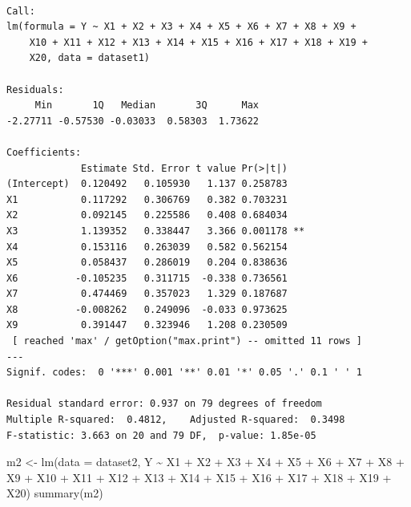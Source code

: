 \documentclass[
  letterpaper,
  DIV=11,
  numbers=noendperiod]{scrartcl}
\newenvironment{Shaded}{\begin{snugshade}}{\end{snugshade}}
\newcommand{\AttributeTok}[1]{\textcolor[rgb]{0.40,0.45,0.13}{#1}}
\newcommand{\FunctionTok}[1]{\textcolor[rgb]{0.28,0.35,0.67}{#1}}
\newcommand{\NormalTok}[1]{\textcolor[rgb]{0.00,0.23,0.31}{#1}}
\newcommand{\OtherTok}[1]{\textcolor[rgb]{0.00,0.23,0.31}{#1}}
\newcommand{\SpecialCharTok}[1]{\textcolor[rgb]{0.37,0.37,0.37}{#1}}
\begin{document}
\begin{verbatim}

Call:
lm(formula = Y ~ X1 + X2 + X3 + X4 + X5 + X6 + X7 + X8 + X9 + 
    X10 + X11 + X12 + X13 + X14 + X15 + X16 + X17 + X18 + X19 + 
    X20, data = dataset1)

Residuals:
     Min       1Q   Median       3Q      Max 
-2.27711 -0.57530 -0.03033  0.58303  1.73622 

Coefficients:
             Estimate Std. Error t value Pr(>|t|)    
(Intercept)  0.120492   0.105930   1.137 0.258783    
X1           0.117292   0.306769   0.382 0.703231    
X2           0.092145   0.225586   0.408 0.684034    
X3           1.139352   0.338447   3.366 0.001178 ** 
X4           0.153116   0.263039   0.582 0.562154    
X5           0.058437   0.286019   0.204 0.838636    
X6          -0.105235   0.311715  -0.338 0.736561    
X7           0.474469   0.357023   1.329 0.187687    
X8          -0.008262   0.249096  -0.033 0.973625    
X9           0.391447   0.323946   1.208 0.230509    
 [ reached 'max' / getOption("max.print") -- omitted 11 rows ]
---
Signif. codes:  0 '***' 0.001 '**' 0.01 '*' 0.05 '.' 0.1 ' ' 1

Residual standard error: 0.937 on 79 degrees of freedom
Multiple R-squared:  0.4812,    Adjusted R-squared:  0.3498 
F-statistic: 3.663 on 20 and 79 DF,  p-value: 1.85e-05
\end{verbatim}

\begin{Shaded}
\begin{Highlighting}[]
\NormalTok{m2 }\OtherTok{\textless{}{-}} \FunctionTok{lm}\NormalTok{(}\AttributeTok{data =}\NormalTok{ dataset2, Y }\SpecialCharTok{\textasciitilde{}}\NormalTok{ X1 }\SpecialCharTok{+}\NormalTok{ X2 }\SpecialCharTok{+}\NormalTok{ X3 }\SpecialCharTok{+}\NormalTok{ X4 }\SpecialCharTok{+}\NormalTok{ X5 }\SpecialCharTok{+}\NormalTok{ X6 }\SpecialCharTok{+}\NormalTok{ X7 }\SpecialCharTok{+}\NormalTok{ X8 }\SpecialCharTok{+}\NormalTok{ X9 }\SpecialCharTok{+}\NormalTok{ X10 }\SpecialCharTok{+} 
\NormalTok{           X11 }\SpecialCharTok{+}\NormalTok{ X12 }\SpecialCharTok{+}\NormalTok{ X13 }\SpecialCharTok{+}\NormalTok{ X14 }\SpecialCharTok{+}\NormalTok{ X15 }\SpecialCharTok{+}\NormalTok{ X16 }\SpecialCharTok{+}\NormalTok{ X17 }\SpecialCharTok{+}\NormalTok{ X18 }\SpecialCharTok{+}\NormalTok{ X19 }\SpecialCharTok{+}\NormalTok{ X20)}
\FunctionTok{summary}\NormalTok{(m2)}
\end{Highlighting}
\end{Shaded}
\end{document}
